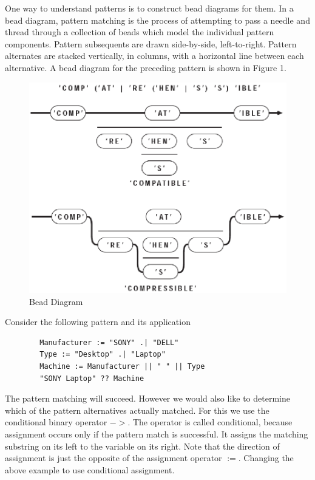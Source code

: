 \documentclass[letterpaper,12pt]{article}
\begin{document}
One way to understand patterns is to construct bead diagrams for
them. In a bead diagram, pattern matching is the process of attempting
to pass a needle and thread through a collection of beads which model
the individual pattern components. Pattern subsequents are drawn
side-by-side, left-to-right. Pattern alternates are stacked
vertically, in columns, with a horizontal line between each
alternative.  A bead diagram for the preceding pattern is shown
in Figure 1.
\begin{figure}[h]
\centering
\includegraphics[width=4.9in]{beaddia.png}
\caption{Bead Diagram}
\end{figure}

Consider the following pattern and its application

\begin{verbatim}
        Manufacturer := "SONY" .| "DELL"
        Type := "Desktop" .| "Laptop"
        Machine := Manufacturer || " " || Type
        "SONY Laptop" ?? Machine
\end{verbatim}

\noindent
The pattern matching will succeed. However we would also like to
determine which of the pattern alternatives actually matched. For this
we use the conditional binary operator \(-\!\!>\). The operator is
called conditional, because assignment occurs only if the pattern
match is successful. It assigns the matching substring on its left to
the variable on its right. Note that the direction of assignment is
just the opposite of the assignment operator $:=$. Changing the above
example to use conditional assignment.
\end{document}
